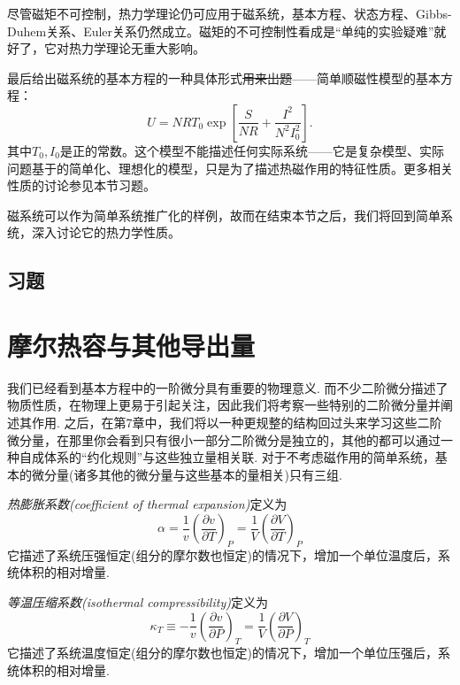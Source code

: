 尽管磁矩不可控制，热力学理论仍可应用于磁系统，基本方程、状态方程、Gibbs-Duhem关系、Euler关系仍然成立。磁矩的不可控制性看成是“单纯的实验疑难”就好了，它对热力学理论无重大影响。

最后给出磁系统的基本方程的一种具体形式\sout{用来出题}——简单顺磁性模型的基本方程：
\begin{equation}
    U = NRT_0 \exp \left[ \frac{S}{NR} + \frac{I^2}{N^2 I_0^2} \right].
\label{equ3.66}
\end{equation}
其中$T_0, I_0$是正的常数。这个模型不能描述任何实际系统——它是复杂模型、实际问题基于的简单化、理想化的模型，只是为了描述热磁作用的特征性质。更多相关性质的讨论参见本节习题。

磁系统可以作为简单系统推广化的样例，故而在结束本节之后，我们将回到简单系统，深入讨论它的热力学性质。

\subsection*{习题}


\section{摩尔热容与其他导出量}
\label{sec3.9}
我们已经看到基本方程中的一阶微分具有重要的物理意义. 而不少二阶微分描述了物质性质，在物理上更易于引起关注，因此我们将考察一些特别的二阶微分量并阐述其作用. 之后，在第7章中，我们将以一种更规整的结构回过头来学习这些二阶微分量，在那里你会看到只有很小一部分二阶微分是独立的，其他的都可以通过一种自成体系的“约化规则”与这些独立量相关联. 对于不考虑磁作用的简单系统，基本的微分量(诸多其他的微分量与这些基本的量相关)只有三组.

{\it 热膨胀系数(coefficient of thermal expansion)}定义为
\begin{equation}
\label{equ3.67}
\alpha=\frac{1}{v}\left(\frac{\partial v}{\partial T}\right)_P=\frac{1}{V}\left(\frac{\partial V}{\partial T}\right)_P
\end{equation}
它描述了系统压强恒定(组分的摩尔数也恒定)的情况下，增加一个单位温度后，系统体积的相对增量.

{\it 等温压缩系数(isothermal compressibility)}定义为
\begin{equation}
\label{equ3.68}
\kappa_T\equiv-\frac{1}{v}\left(\frac{\partial v}{\partial P}\right)_T=\frac{1}{V}\left(\frac{\partial V}{\partial P}\right)_T
\end{equation}
它描述了系统温度恒定(组分的摩尔数也恒定)的情况下，增加一个单位压强后，系统体积的相对增量.

